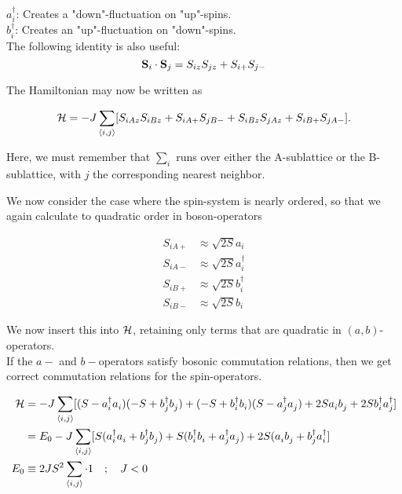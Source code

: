 $a_i^\dagger$: Creates a "down"-fluctuation on "up"-spins. \\
$b_i^\dagger$: Creates an "up"-fluctuation on "down"-spins. \\

The following identity is also useful:
\begin{equation}
	\vb{S}_i \cdot \vb{S}_j = S_{iz}S_{jz} + S_{i+}S_{j-}
\end{equation}

The Hamiltonian may now be written as

\begin{equation}
	\mathcal{H} = -J \sum_{\langle i, j \rangle} [S_{iAz}S_{iBz} + S_{iA+}S_{jB-} + S_{iBz}S_{jAz} + S_{iB+}S_{jA-}].
\end{equation}

\begin{tcolorbox}
	Here, we must remember that $\sum_i$ runs over either the A-sublattice or the B-sublattice, with $j$ the corresponding nearest neighbor.
\end{tcolorbox}

We now consider the case where the spin-system is nearly ordered, so that we again calculate to quadratic order in boson-operators

\begin{align}
	S_{iA+} &\approx \sqrt{2S}a_i \\
	S_{iA-} &\approx \sqrt{2S}a_i^\dagger \\
	S_{iB+} &\approx \sqrt{2S}b_i^\dagger \\
	S_{iB-} &\approx \sqrt{2S}b_i 
\end{align}

We now insert this into $\mathcal{H}$, retaining only terms that are quadratic in $(a, b)$-operators. \\

If the $a-$ and $b-$operators satisfy bosonic commutation relations, then we get correct commutation relations for the spin-operators.

\begin{align}
	\mathcal{H} &= -J \sum_{\langle i, j \rangle} [(S - a_i^\dagger a_i^{})(-S + b_j^\dagger b_j^{}) + (-S + b_i^\dagger b_i^{})(S - a_j^\dagger a_j^{}) + 2S a_i^{} b_j^{} + 2S b_i^\dagger a_j ^\dagger] \\
	&= E_0 - J\sum_{\langle i, j \rangle} [S(a_i^\dagger a_i^{} + b_j^\dagger b_j^{}) + S(b_i^\dagger b_i^{} + a_j^\dagger a_j^{}) + 2S (a_i^{} b_j^{} + b_j^\dagger a_i^\dagger] \\
	E_0 &\equiv 2JS^2 \sum_{\langle i, j \rangle}\cdot 1 \quad ; \quad J < 0
\end{align}

